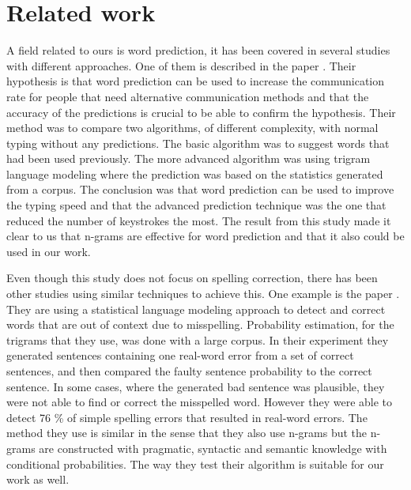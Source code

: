 \documentclass[a4paper,12pt]{article}
\begin{document}
\section{Related work}
\label{sec:relatedwork}
A field related to ours is word prediction, it has been covered in several studies with different approaches. One of them is described in the paper \cite{trnka2009user}. Their hypothesis is that word prediction can be used to increase the communication rate for people that need alternative communication methods and that the accuracy of the predictions is crucial to be able to confirm the hypothesis. Their method was to compare two algorithms, of different complexity, with normal typing without any predictions. The basic algorithm was to suggest words that had been used previously. The more advanced algorithm was using trigram language modeling where the prediction was based on the statistics generated from a corpus. The conclusion was that word prediction can be used to improve the typing speed and that the advanced prediction technique was the one that reduced the number of keystrokes the most. The result from this study made it clear to us that n-grams are effective for word prediction and that it also could be used in our work.

Even though this study does not focus on spelling correction, there has been other studies using similar techniques to achieve this. One example is the paper \cite{Mays1991}. They are using a statistical language modeling approach to detect and correct words that are out of context due to misspelling.  Probability estimation, for the trigrams that they use, was done with a large corpus. In their experiment they generated sentences containing one real-word error from a set of correct sentences, and then compared the faulty sentence probability to the correct sentence. In some cases, where the generated bad sentence was plausible, they were not able to find or correct the misspelled word. However they were able to detect 76 \% of simple spelling errors that resulted in real-word errors. The method they use is similar in the sense that they also use n-grams but the n-grams are constructed with pragmatic, syntactic and semantic knowledge with conditional probabilities. The way they test their algorithm is suitable for our work as well.
\end{document}
